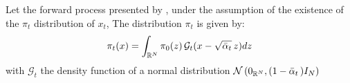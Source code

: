 \documentclass[a4paper,10pt]{article}
\begin{document}
\begin{proposition}\label{prop:distribution_a_etap_t}
    Let the forward process presented by , under the assumption of the existence of the $\pi_t$ distribution of $x_t$, The distribution $\pi_t$ is given by:    
    \begin{equation}\label{eq:distribution_pi_t}
        \pi_t(x) = \int_{\mathbb{R}^N} \pi_0(z)\, \mathcal{G}_t(x - \sqrt{\bar \alpha_t}\,z) dz
    \end{equation}
    with $\mathcal{G}_t$ the density function of a normal distribution $\mathcal{N}\left(0_{\mathbb{R}^N}, (1- \bar\alpha _t \,)I_N\right)$
\end{proposition}
\end{document}
